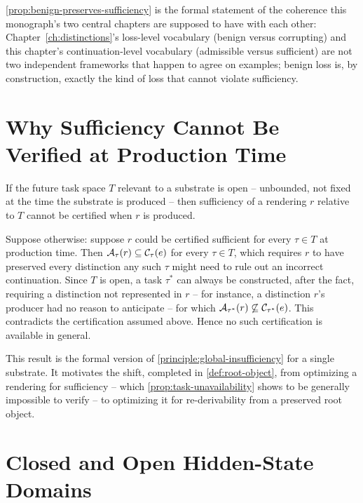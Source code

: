 \cref{prop:benign-preserves-sufficiency} is the formal statement of the
coherence this monograph's two central chapters are supposed to have with
each other: Chapter~\ref{ch:distinctions}'s loss-level vocabulary
(benign versus corrupting) and this chapter's continuation-level
vocabulary (admissible versus sufficient) are not two independent
frameworks that happen to agree on examples; benign loss is, by
construction, exactly the kind of loss that cannot violate sufficiency.

\section{Why Sufficiency Cannot Be Verified at Production Time}

\begin{proposition}
\label{prop:task-unavailability}
If the future task space $T$ relevant to a substrate is open -- unbounded,
not fixed at the time the substrate is produced -- then sufficiency of a
rendering $r$ relative to $T$ cannot be certified when $r$ is produced.
\end{proposition}

\begin{proofsketch}
Suppose otherwise: suppose $r$ could be certified sufficient for every
$\tau \in T$ at production time. Then $\mathcal{A}_{\tau}(r) \subseteq
\mathcal{C}_\tau(e)$ for every $\tau \in T$, which requires $r$ to have
preserved every distinction any such $\tau$ might need to rule out an
incorrect continuation. Since $T$ is open, a task $\tau^*$ can always be
constructed, after the fact, requiring a distinction not represented in
$r$ -- for instance, a distinction $r$'s producer had no reason to
anticipate -- for which $\mathcal{A}_{\tau^*}(r) \not\subseteq
\mathcal{C}_{\tau^*}(e)$. This contradicts the certification assumed
above. Hence no such certification is available in general.
\end{proofsketch}

This result is the formal version of \cref{principle:global-insufficiency}
for a single substrate. It motivates the shift, completed in
\cref{def:root-object}, from optimizing a rendering for sufficiency --
which \cref{prop:task-unavailability} shows to be generally impossible to
verify -- to optimizing it for re-derivability from a preserved root
object.

\section{Closed and Open Hidden-State Domains}

